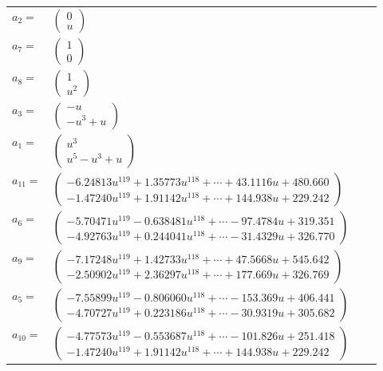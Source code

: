 \documentclass[1p]{elsarticle_modified}
\theoremstyle{definition}
\begin{document}
\begin{tabular}{m{7pt} m{180pt} m{7pt} m{180pt} }
\flushright $a_{2}=$&$\begin{pmatrix}0\\u\end{pmatrix}$ \\
\flushright $a_{7}=$&$\begin{pmatrix}1\\0\end{pmatrix}$ \\
\flushright $a_{8}=$&$\begin{pmatrix}1\\u^2\end{pmatrix}$ \\
\flushright $a_{3}=$&$\begin{pmatrix}- u\\- u^3+u\end{pmatrix}$ \\
\flushright $a_{1}=$&$\begin{pmatrix}u^3\\u^5- u^3+u\end{pmatrix}$ \\
\flushright $a_{11}=$&$\begin{pmatrix}-6.24813 u^{119}+1.35773 u^{118}+\cdots+43.1116 u+480.660\\-1.47240 u^{119}+1.91142 u^{118}+\cdots+144.938 u+229.242\end{pmatrix}$ \\
\flushright $a_{6}=$&$\begin{pmatrix}-5.70471 u^{119}-0.638481 u^{118}+\cdots-97.4784 u+319.351\\-4.92763 u^{119}+0.244041 u^{118}+\cdots-31.4329 u+326.770\end{pmatrix}$ \\
\flushright $a_{9}=$&$\begin{pmatrix}-7.17248 u^{119}+1.42733 u^{118}+\cdots+47.5668 u+545.642\\-2.50902 u^{119}+2.36297 u^{118}+\cdots+177.669 u+326.769\end{pmatrix}$ \\
\flushright $a_{5}=$&$\begin{pmatrix}-7.55899 u^{119}-0.806060 u^{118}+\cdots-153.369 u+406.441\\-4.70727 u^{119}+0.223186 u^{118}+\cdots-30.9319 u+305.682\end{pmatrix}$ \\
\flushright $a_{10}=$&$\begin{pmatrix}-4.77573 u^{119}-0.553687 u^{118}+\cdots-101.826 u+251.418\\-1.47240 u^{119}+1.91142 u^{118}+\cdots+144.938 u+229.242\end{pmatrix}$ \\

\end{tabular}
\end{document}
